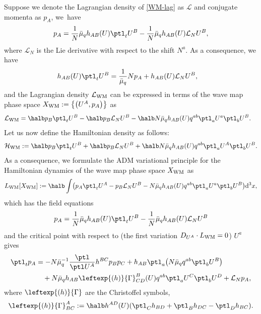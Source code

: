 Suppose we denote the Lagrangian density of \eqref{WM-lag} as $\mathcal{L}$ and conjugate momenta as $p_A$, we~have
\begin{align*}
p_A = \frac{1}{N} \bar{\mu}_q h_{AB}(U) \ptl_t U^B - \frac{1}{N} \bar{\mu}_q h_{AB} (U) \mathcal{L}_N U^B,
\end{align*}
where $\mathcal{L}_N$ is the Lie derivative with respect to the shift $N^a$. As a consequence, we have
\begin{align*}
h_{AB} (U)\ptl_t U^B &{}= \frac{1}{\bar{\mu}_q} N p_A + h_{AB} (U) \mathcal{L}_N U^B,
\end{align*}
and the Lagrangian density $\mathcal{L}_{{\rm WM}}$ can be expressed in terms of the wave map phase space $X_{{\rm WM}} := \bigl\{ \bigl(U^A, p_A\bigr) \bigr\}$ as
\begin{align*}
\mathcal{L}_{{\rm WM}} &{}= \halb p_B \ptl_t U^B - \halb p_B \mathcal{L}_N U^B - \halb N \bar{\mu}_q h_{AB} (U) q^{ab} \ptl_a U^a \ptl_b U^B.
\end{align*}
Let us now define the Hamiltonian density as follows:
\begin{align*}
\mathcal{H}_{{\rm WM}} := \halb p_B \ptl_t U^B + \halb p_B \mathcal{L}_N U^B + \halb N \bar{\mu}_q h_{AB} (U) q^{ab} \ptl_a U^A \ptl_b U^B.
\end{align*}
As a consequence, we formulate the ADM variational principle for the Hamiltonian dynamics of the wave map phase space $X_{{\rm WM}}$ as
\begin{align*}
L_{{\rm WM}} [X_{{\rm WM}}] := \halb \int \bigl(p_A \ptl_t U^A - p_B \mathcal{L}_N U^B - N \bar{\mu}_q h_{AB} (U) q^{ab} \ptl_a U^a \ptl_b U^B\bigr){\rm d}^3x,
\end{align*}
which has the field equations
\begin{align} \label{u-dot}
p_A = \frac{1}{N} \bar{\mu}_q h_{AB} (U) \ptl_t U^B - \frac{1}{N} \bar{\mu}_q h_{AB} (U) \mathcal{L}_N U^B
\end{align}
and the critical point with respect to \big(the first variation $ D_{U^A} \cdot L_{{\rm WM}}=0$\big) $U^a$ gives
\begin{align}
\ptl_t p_A&{}= -N \bar{\mu}^{-1}_q \frac{\ptl}{\ptl U^A}h^{BC} p_B p_C + h_{AB} \ptl_a\bigl(N \bar{\mu}_q q^{ab} \ptl_b U^B\bigr) \notag\\
&\quad{}+ N\bar{\mu}_q h_{AB} \leftexp{(h)}{\Gamma}^B_{CD}(U)q^{ab}\ptl_a U^C \ptl_b U^D
 + \mathcal{L}_N p_A,\label{p-dot}
\end{align}
where $\leftexp{(h)}{\Gamma}$ are the Christoffel symbols,
\[
\leftexp{(h)}{\Gamma}^A_{BC} := \halb h^{AD}(U) (\ptl_C h_{BD} + \ptl_B h_{DC} - \ptl_D h_{BC}).
\]
